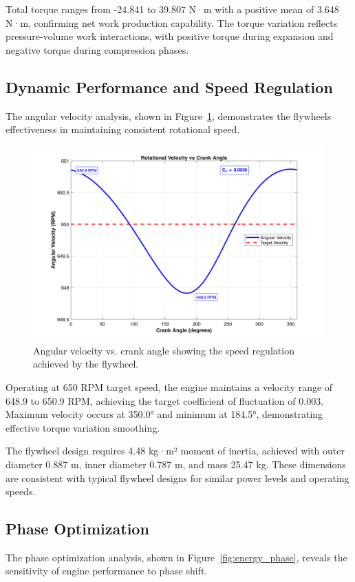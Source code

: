 \documentclass[12pt]{article}
\begin{document}
Total torque ranges from -24.841 to 39.807 N·m with a positive mean of 3.648 N·m, confirming net work production capability. The torque variation reflects pressure-volume work interactions, with positive torque during expansion and negative torque during compression phases.

\subsection{Dynamic Performance and Speed Regulation}
The angular velocity analysis, shown in Figure~\ref{fig:angular_velocity}, demonstrates the flywheel\textquotesingle s effectiveness in maintaining consistent rotational speed.

\begin{figure}[htbp]
  \centering
  \includegraphics[width=0.8\linewidth]{../angular_velocity.png}
  \caption{Angular velocity vs. crank angle showing the speed regulation achieved by the flywheel.}
  \label{fig:angular_velocity}
\vspace{-6pt}\end{figure}

Operating at 650 RPM target speed, the engine maintains a velocity range of 648.9 to 650.9 RPM, achieving the target coefficient of fluctuation of 0.003. Maximum velocity occurs at 350.0° and minimum at 184.5°, demonstrating effective torque variation smoothing.

The flywheel design requires 4.48 kg·m² moment of inertia, achieved with outer diameter 0.887 m, inner diameter 0.787 m, and mass 25.47 kg. These dimensions are consistent with typical flywheel designs for similar power levels and operating speeds.

\subsection{Phase Optimization}
The phase optimization analysis, shown in Figure~\ref{fig:energy_phase}, reveals the sensitivity of engine performance to phase shift.
\end{document}
